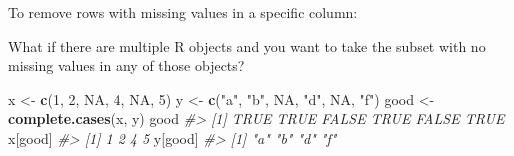 \documentclass[
]{book}
\newenvironment{Shaded}{\begin{snugshade}}{\end{snugshade}}
\newcommand{\CommentTok}[1]{\textcolor[rgb]{0.56,0.35,0.01}{\textit{#1}}}
\newcommand{\ConstantTok}[1]{\textcolor[rgb]{0.56,0.35,0.01}{#1}}
\newcommand{\DecValTok}[1]{\textcolor[rgb]{0.00,0.00,0.81}{#1}}
\newcommand{\FunctionTok}[1]{\textcolor[rgb]{0.13,0.29,0.53}{\textbf{#1}}}
\newcommand{\NormalTok}[1]{#1}
\newcommand{\OtherTok}[1]{\textcolor[rgb]{0.56,0.35,0.01}{#1}}
\newcommand{\SpecialCharTok}[1]{\textcolor[rgb]{0.81,0.36,0.00}{\textbf{#1}}}
\newcommand{\StringTok}[1]{\textcolor[rgb]{0.31,0.60,0.02}{#1}}
\begin{document}
To remove rows with missing values in a specific column:

\begin{Shaded}
\end{Shaded}

What if there are multiple R objects and you want to take the subset
with no missing values in any of those objects?

\begin{Shaded}
\begin{Highlighting}[]
\NormalTok{x }\OtherTok{\textless{}{-}} \FunctionTok{c}\NormalTok{(}\DecValTok{1}\NormalTok{, }\DecValTok{2}\NormalTok{, }\ConstantTok{NA}\NormalTok{, }\DecValTok{4}\NormalTok{, }\ConstantTok{NA}\NormalTok{, }\DecValTok{5}\NormalTok{)}
\NormalTok{y }\OtherTok{\textless{}{-}} \FunctionTok{c}\NormalTok{(}\StringTok{"a"}\NormalTok{, }\StringTok{"b"}\NormalTok{, }\ConstantTok{NA}\NormalTok{, }\StringTok{"d"}\NormalTok{, }\ConstantTok{NA}\NormalTok{, }\StringTok{"f"}\NormalTok{)}
\NormalTok{good }\OtherTok{\textless{}{-}} \FunctionTok{complete.cases}\NormalTok{(x, y)}
\NormalTok{good}
\CommentTok{\#\textgreater{} [1]  TRUE  TRUE FALSE  TRUE FALSE  TRUE}
\NormalTok{x[good]}
\CommentTok{\#\textgreater{} [1] 1 2 4 5}
\NormalTok{y[good]}
\CommentTok{\#\textgreater{} [1] "a" "b" "d" "f"}
\end{Highlighting}
\end{Shaded}
\end{document}
